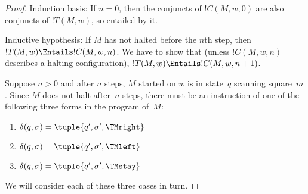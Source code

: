 \documentclass[../../../include/open-logic-section]{subfiles}
\begin{document}
\begin{proof}
Induction basis: If $n = 0$, then the conjuncts of $!C(M, w, 0)$ are
also conjuncts of $!T(M, w)$, so entailed by it.

Inductive hypothesis: If $M$ has not halted before the $n$th step,
then $!T(M,w) \Entails !C(M, w, n)$. We have to show that (unless
$!C(M, w, n)$ describes a halting configuration), $!T(M, w) \Entails
!C(M, w, n+1)$.

Suppose $n > 0$ and after $n$ steps, $M$ started on $w$ is in
state~$q$ scanning square~$m$. Since $M$ does not halt after~$n$
steps, there must be an instruction of one of the following three
forms in the program of~$M$:

\begin{enumerate} 
\item {} $\delta(q, \sigma) = \tuple{q', \sigma', \TMright}$

\item {} $\delta(q, \sigma) = \tuple{q', \sigma', \TMleft}$

\item {} $\delta(q, \sigma) = \tuple{q', \sigma', \TMstay}$
\end{enumerate}

We will consider each of these three cases in turn. 


\end{proof}
\end{document}
